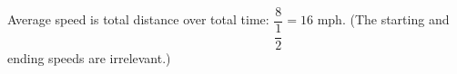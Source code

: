 Average speed is total distance over total time: $\dfrac{8}{\dfrac{1}{2}}=\boxed{16}$ mph. (The starting and ending speeds are irrelevant.)
